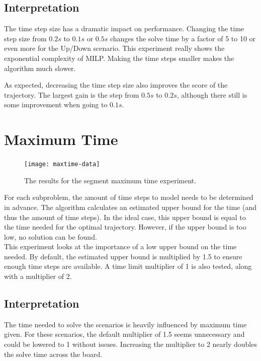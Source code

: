 \subsection{Interpretation}
The time step size has a dramatic impact on performance. Changing the time step size from $0.2s$ to $0.1s$ or $0.5s$ changes the solve time by a factor of 5 to 10 or even more for the Up/Down scenario. This experiment really shows the exponential complexity of MILP. Making the time steps smaller makes the algorithm much slower.
\par
As expected, decreasing the time step size also improves the score of the trajectory. The largest gain is the step from $0.5s$ to $0.2s$, although there still is some improvement when going to $0.1s$.


\section{Maximum Time}
\label{subsec:maxtime}
\begin{figure}[]
	\centering
	\texttt{[image: maxtime-data]}
	\caption{The results for the segment maximum time experiment.}
	\label{fig:maxtime-data}
\end{figure}
For each subproblem, the amount of time steps to model needs to be determined in advance. The algorithm calculates an estimated upper bound for the time (and thus the amount of time steps). In the ideal case, this upper bound is equal to the time needed for the optimal trajectory. However, if the upper bound is too low, no solution can be found.\\
This experiment looks at the importance of a low upper bound on the time needed. By default, the estimated upper bound is multiplied by 1.5 to ensure enough time steps are available. A time limit multiplier of 1 is also tested, along with a multiplier of 2. 

\subsection{Interpretation}
The time needed to solve the scenarios is heavily influenced by maximum time given. For these scenarios, the default multiplier of 1.5 seems unnecessary and could be lowered to 1 without issues. Increasing the multiplier to 2 nearly doubles the solve time across the board.


\clearpage
